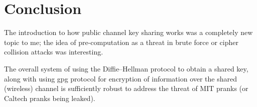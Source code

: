 \documentclass{report}
\begin{document}
\section*{Conclusion}
The introduction to how public channel key sharing works was a completely new topic to me; the idea of pre-computation as a threat in brute force or cipher collision attacks was interesting. 

The overall system of using the Diffie–Hellman protocol to obtain a shared key, along with using gpg protocol for encryption of information over the shared (wireless) channel is sufficiently robust to address the threat of MIT pranks (or Caltech pranks being leaked).
\end{document}
